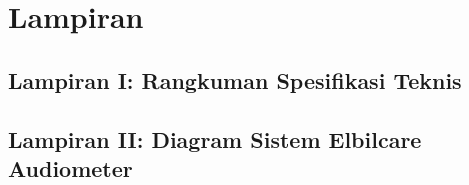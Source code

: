 \documentclass[11pt,a4paper,twoside,onecolumn]{book}
\begin{document}
	\newpage
	
	\chapter{Lampiran}
		\section{Lampiran I: Rangkuman Spesifikasi Teknis}
		\section{Lampiran II: Diagram Sistem Elbilcare Audiometer}
	\newpage
	
	
	
\end{document}
